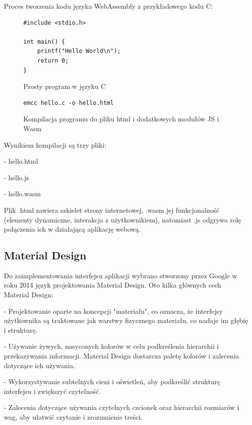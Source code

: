 \documentclass[a4paper,twoside,12pt]{book}
\begin{document}
Proces tworzenia kodu języka WebAssembly z przykładowego kodu C:

\begin{figure}[H]
\centering
\begin{lstlisting}
#include <stdio.h>

int main() {
    printf("Hello World\n");
    return 0;
}
\end{lstlisting}
\caption{Prosty program w języku C}
\label{fig:pseudokod:listings}
\end{figure}

\begin{figure}
\centering
\begin{lstlisting}
emcc hello.c -o hello.html
\end{lstlisting}
\caption{Kompilacja programu do pliku html i dodatkowych modułów JS i Wasm}
\label{fig:pseudokod:listings}
\end{figure}

\hfill\break
\hfill\break
\hfill\break
\hfill\break
Wynikiem kompilacji są trzy pliki:

- hello.html

- hello.js

- hello.wasm

Plik .html zawiera szkielet strony internetowej, .wasm jej 
funkcjonalność (elementy dynamiczne, interakcja z użytkownikiem), natomiast 
.js odgrywa rolę połączenia ich w działającą aplikację webową.

\subsection{Material Design}
Do zaimplementowania interfejsu aplikacji wybrano stworzony przez 
Google w roku 2014 język projektowania Material Design. 
Oto kilka głównych cech Material Design:

- Projektowanie oparte na koncepcji "materiału", co oznacza, że interfejsy użytkownika są traktowane jak warstwy fizycznego materiału, co nadaje im głębię i strukturę.

- Używanie żywych, nasyconych kolorów w celu podkreślenia hierarchii i przekazywania informacji. Material Design dostarcza paletę kolorów i zalecenia dotyczące ich używania.

- Wykorzystywanie subtelnych cieni i oświetleń, aby podkreślić strukturę interfejsu i zwiększyć czytelność.

- Zalecenia dotyczące używania czytelnych czcionek oraz hierarchii rozmiarów i wag, aby ułatwić czytanie i zrozumienie treści.
\end{document}
